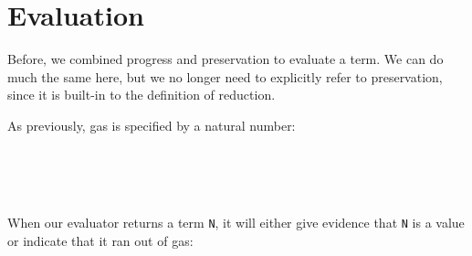 \hypertarget{evaluation}{%
\section{Evaluation}\label{evaluation}}

Before, we combined progress and preservation to evaluate a term. We can
do much the same here, but we no longer need to explicitly refer to
preservation, since it is built-in to the definition of reduction.

As previously, gas is specified by a natural number:

\begin{fence}
\begin{code}%
\>[0]\AgdaSpace{}%
\AgdaSpace{}%
\AgdaSymbol{:}\AgdaSpace{}%
\AgdaSpace{}%
\<%
\\
\>[0][@{}l@{\AgdaIndent{0}}]%
\>[2]\AgdaSpace{}%
\<%
\\
%
\>[2]\<%
\\
\>[2][@{}l@{\AgdaIndent{0}}]%
\>[4]\AgdaSpace{}%
\AgdaSymbol{:}\AgdaSpace{}%
\<%
\end{code}
\end{fence}

When our evaluator returns a term \texttt{N}, it will either give
evidence that \texttt{N} is a value or indicate that it ran out of gas:

\begin{fence}
\begin{code}%
\>[0]\AgdaSpace{}%
\AgdaSpace{}%
\AgdaSymbol{\{}\AgdaSpace{}%
\AgdaSymbol{\}}\AgdaSpace{}%
\AgdaSymbol{(}\AgdaSpace{}%
\AgdaSymbol{:}\AgdaSpace{}%
\AgdaSpace{}%
\AgdaSpace{}%
\AgdaSymbol{)}\AgdaSpace{}%
\AgdaSymbol{:}\AgdaSpace{}%
\AgdaSpace{}%
\<%
\\
%
\\[\AgdaEmptyExtraSkip]%
\>[0][@{}l@{\AgdaIndent{0}}]%
\>[3]\AgdaSpace{}%
\AgdaSymbol{:}\<%
\\
\>[3][@{}l@{\AgdaIndent{0}}]%
\>[7]\AgdaSpace{}%
\<%
\\
%
\>[7]\AgdaComment{----------}\<%
\\
\>[3][@{}l@{\AgdaIndent{0}}]%
\>[5]\AgdaSpace{}%
\AgdaSpace{}%
\<%
\\
%
\\[\AgdaEmptyExtraSkip]%
%
\>[3]\AgdaSpace{}%
\AgdaSymbol{:}\<%
\\
\>[3][@{}l@{\AgdaIndent{0}}]%
\>[7]\AgdaComment{----------}\<%
\\
%
\>[7]\AgdaSpace{}%
\<%
\end{code}
\end{fence}


